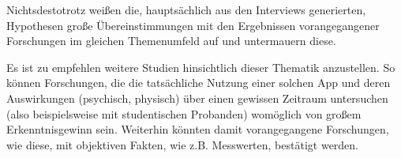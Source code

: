 \documentclass[10pt]{article}
\begin{document}
Nichtsdestotrotz weißen die, hauptsächlich aus den Interviews generierten, Hypothesen große Übereinstimmungen mit den Ergebnissen vorangegangener Forschungen im gleichen Themenumfeld auf und untermauern diese.

Es ist zu empfehlen weitere Studien hinsichtlich dieser Thematik anzustellen. So können Forschungen, die die tatsächliche Nutzung einer solchen App und deren Auswirkungen (psychisch, physisch) über einen gewissen Zeitraum untersuchen (also beispielsweise mit studentischen Probanden) womöglich von großem Erkenntnisgewinn sein. Weiterhin könnten damit vorangegangene Forschungen, wie diese, mit objektiven Fakten, wie z.B. Messwerten, bestätigt werden.


\nocite{*}
\printbibliography
\end{document}
